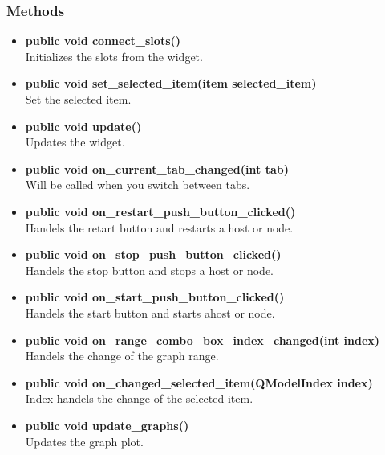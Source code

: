 \subsubsection{Methods}
\begin{itemize}
  \item \textbf{public void connect\_slots()}\\
  Initializes the slots from the widget.
  \item \textbf{public void set\_selected\_item(item selected\_item)}\\
  Set the selected item.
  \item \textbf{public void update()}\\
  Updates the widget.
  \item \textbf{public void on\_current\_tab\_changed(int tab)}\\
  Will be called when you switch between tabs.
  \item \textbf{public void on\_restart\_push\_button\_clicked()}\\
  Handels the retart button and restarts a host or node.
  \item \textbf{public void on\_stop\_push\_button\_clicked()}\\
  Handels the stop button and stops a host or node.
  \item \textbf{public void on\_start\_push\_button\_clicked()}\\
  Handels the start button and starts ahost or node.
  \item \textbf{public void on\_range\_combo\_box\_index\_changed(int index)}\\
  Handels the change of the graph range.
  \item \textbf{public void on\_changed\_selected\_item(QModelIndex index)}\\
  Index handels the change of the selected item.
  \item \textbf{public void update\_graphs()}\\
  Updates the graph plot.
\end{itemize}
